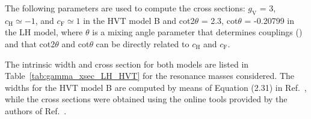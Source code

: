 The following parameters are used to compute the cross sections: $g_\mathrm{V}$ = 3, $c_\mathrm{H} \simeq -1$, and $c_\mathrm{F} \simeq 1$
in the HVT model B and cot2$\theta$ = 2.3, cot$\theta$ = -0.20799 in the LH model, where $\theta$ is a mixing
angle parameter that determines \Wpr couplings () and that cot2$\theta$ and cot$\theta$ can be directly related to $c_\mathrm{H}$ and $c_\mathrm{F}$.

The intrinsic width and cross section for both models are listed in Table~\ref{tab:gamma_xsec_LH_HVT} for the resonance masses considered.
The widths for the HVT model B are computed by means of Equation (2.31) in Ref.~\cite{Pappadopulo:2014qza},
while the cross sections were obtained using the online tools provided by the authors of Ref.~\cite{Pappadopulo:2014qza}.

